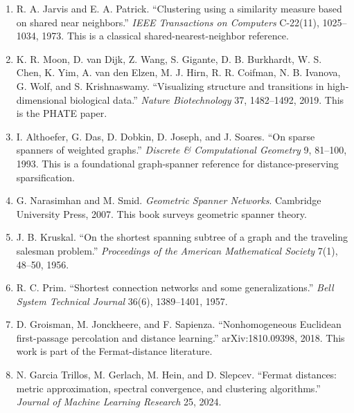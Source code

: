 \documentclass[11pt]{article}
\begin{document}
\begin{enumerate}[leftmargin=2em]
  \item R. A. Jarvis and E. A. Patrick. ``Clustering using a similarity measure based on
  shared near neighbors.'' \emph{IEEE Transactions on Computers} C-22(11),
  1025--1034, 1973.  This is a classical shared-nearest-neighbor reference.

  \item K. R. Moon, D. van Dijk, Z. Wang, S. Gigante, D. B. Burkhardt, W. S. Chen,
  K. Yim, A. van den Elzen, M. J. Hirn, R. R. Coifman, N. B. Ivanova, G. Wolf, and
  S. Krishnaswamy. ``Visualizing structure and transitions in high-dimensional
  biological data.'' \emph{Nature Biotechnology} 37, 1482--1492, 2019.  This is the
  PHATE paper.

  \item I. Althoefer, G. Das, D. Dobkin, D. Joseph, and J. Soares. ``On sparse spanners
  of weighted graphs.'' \emph{Discrete \& Computational Geometry} 9, 81--100, 1993.
  This is a foundational graph-spanner reference for distance-preserving sparsification.

  \item G. Narasimhan and M. Smid. \emph{Geometric Spanner Networks}. Cambridge
  University Press, 2007.  This book surveys geometric spanner theory.

  \item J. B. Kruskal. ``On the shortest spanning subtree of a graph and the traveling
  salesman problem.'' \emph{Proceedings of the American Mathematical Society} 7(1),
  48--50, 1956.

  \item R. C. Prim. ``Shortest connection networks and some generalizations.''
  \emph{Bell System Technical Journal} 36(6), 1389--1401, 1957.

  \item D. Groisman, M. Jonckheere, and F. Sapienza. ``Nonhomogeneous Euclidean
  first-passage percolation and distance learning.'' arXiv:1810.09398, 2018.
  This work is part of the Fermat-distance literature.

  \item N. Garcia Trillos, M. Gerlach, M. Hein, and D. Slepcev. ``Fermat distances:
  metric approximation, spectral convergence, and clustering algorithms.''
  \emph{Journal of Machine Learning Research} 25, 2024.
\end{enumerate}
\end{document}
